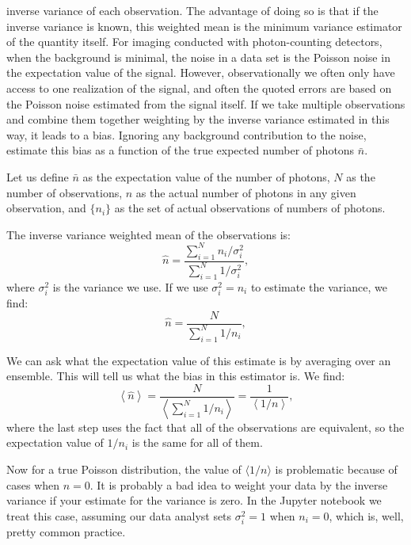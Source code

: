 \begin{enumerate}
inverse variance of each observation. The advantage of doing so is
that if the inverse variance is known, this weighted mean is the
minimum variance estimator of the quantity itself. For imaging
conducted with photon-counting detectors, when the background is
minimal, the noise in a data set is the Poisson noise in
the expectation value of the signal. However, observationally we often
only have access to one realization of the signal, and often the
quoted errors are based on the Poisson noise estimated from the signal
itself. If we take multiple observations and combine them together
weighting by the inverse variance estimated in this way, it leads to a
bias. Ignoring any background contribution to the noise, estimate this
bias as a function of the true expected number of photons $\bar n$.

\begin{answer}
Let us define $\bar n$ as the expectation value of the number of
photons, $N$ as the number of observations, $n$ as the actual number
of photons in any given observation, and $\{n_i\}$ as the set of
actual observations of numbers of photons.

The inverse variance weighted mean of the observations is:
\begin{equation}
{\hat n} = \frac{\sum_{i=1}^N n_i / \sigma_i^2}
{\sum_{i=1}^N 1 / \sigma_i^2},
\end{equation}
where $\sigma_i^2$ is the variance we use. If we use $\sigma_i^2 =
n_i$ to estimate the variance, we find:
\begin{equation}
{\hat n} = \frac{N}{\sum_{i=1}^N 1 / n_i},
\end{equation}

We can ask what the expectation value of this estimate is by averaging
over an ensemble. This will tell us what the bias in this estimator
is. We find:
\begin{equation}
\left\langle {\hat n} \right\rangle
= \frac{N}{\left\langle \sum_{i=1}^N 1 / n_i \right\rangle}
= \frac{1}{\left\langle 1/n\right\rangle},
\end{equation}
where the last step uses the fact that all of the observations are
equivalent, so the expectation value of $1/n_i$ is the same for all of
them. 

Now for a true Poisson distribution, the value of $\langle 1/n\rangle$
is problematic because of cases when $n=0$. It is probably a
bad idea to weight your data by the inverse variance if your estimate
for the variance is zero. In the Jupyter notebook we treat this case,
assuming our data analyst sets $\sigma_i^2 = 1$ when $n_i=0$, which
is, well, pretty common practice.


\end{answer}
\end{enumerate}
